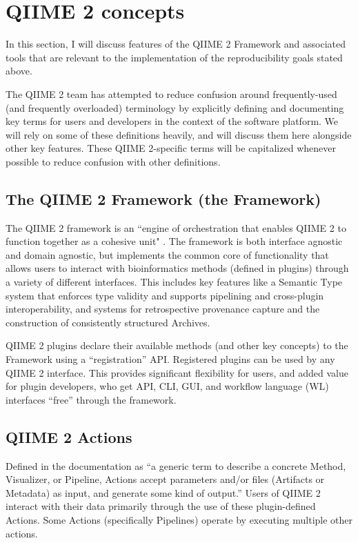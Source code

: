 \section{QIIME 2 concepts}

In this section, I will discuss features of the QIIME 2 Framework and associated
tools that are relevant to the implementation of the reproducibility goals
stated above. 

The QIIME 2 team has attempted to reduce confusion around frequently-used (and
frequently overloaded) terminology by explicitly defining and documenting key
terms for users \parencite{qiime_2_development_team_glossary_2016} and
developers \parencite{qiime_2_development_team_glossary_2018} in the context of
the software platform.  We will rely on some of these definitions heavily, and
will discuss them here alongside other key features. These QIIME 2-specific
terms will be capitalized whenever possible to reduce confusion with other
definitions.

\subsection{The QIIME 2 Framework (the Framework)}

The QIIME 2 framework is an “engine of orchestration that enables QIIME 2 to
function together as a cohesive unit" \parencite{qiime_2_development_team_glossary_2018}.
The framework is both interface agnostic and domain agnostic, but implements the
common core of functionality that allows users to interact with bioinformatics
methods (defined in plugins) through a variety of different interfaces. This
includes key features like a Semantic Type system that enforces type validity
and supports pipelining and cross-plugin interoperability, and systems for
retrospective provenance capture and the construction of consistently structured
Archives.

QIIME 2 plugins declare their available methods (and other key concepts) to the
Framework using a “registration” API. Registered plugins can be used by any
QIIME 2 interface. This provides significant flexibility for users, and added
value for plugin developers, who get API, CLI, GUI, and workflow language (WL)
interfaces “free” through the framework.

\subsection{QIIME 2 Actions}

Defined in the documentation as “a generic term to describe a concrete Method,
Visualizer, or Pipeline, Actions accept parameters and/or files (Artifacts or
Metadata) as input, and generate some kind of output.” Users of QIIME 2 interact
with their data primarily through the use of these plugin-defined Actions. Some
Actions (specifically Pipelines) operate by executing multiple other actions.

